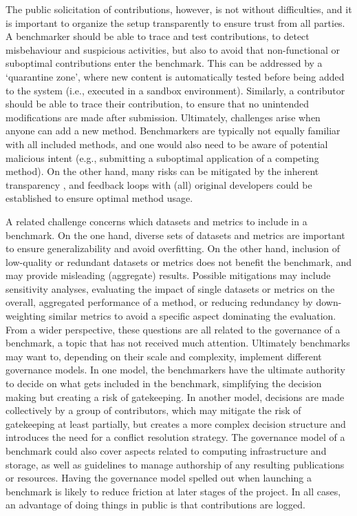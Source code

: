 \documentclass[11pt]{article}
\begin{document}
The public solicitation of contributions, however, is not without difficulties, and it is important to organize the setup transparently to ensure trust from all parties. A benchmarker should be able to trace and test contributions, to detect misbehaviour and suspicious activities, but also to avoid that non-functional or suboptimal contributions enter the benchmark. This can be addressed by a `quarantine zone', where new content is automatically tested before being added to the system (i.e., executed in a sandbox environment). Similarly, a contributor should be able to trace their contribution, to ensure that no unintended modifications are made after submission. Ultimately, challenges arise when anyone can add a new method. Benchmarkers are typically not equally familiar with all included methods, and one would also need to be aware of potential malicious intent (e.g., submitting a suboptimal application of a competing method). On the other hand, many risks can be mitigated by the inherent transparency \cite{Greenstein2016-os}, and feedback loops with (all) original developers could be established to ensure optimal method usage.

A related challenge concerns which datasets and metrics to include in a benchmark. On the one hand, diverse sets of datasets and metrics are important to ensure generalizability and avoid overfitting. On the other hand, inclusion of low-quality or redundant datasets or metrics does not benefit the benchmark, and may provide misleading (aggregate) results. Possible mitigations may include sensitivity analyses, evaluating the impact of single datasets or metrics on the overall, aggregated performance of a method, or reducing redundancy by down-weighting similar metrics to avoid a specific aspect dominating the evaluation. From a wider perspective, these questions are all related to the governance of a benchmark, a topic that has not received much attention. Ultimately benchmarks may want to, depending on their scale and complexity, implement different governance models. In one model, the benchmarkers have the ultimate authority to decide on what gets included in the benchmark, simplifying the decision making but creating a risk of gatekeeping. In another model, decisions are made collectively by a group of contributors, which may mitigate the risk of gatekeeping at least partially, but creates a more complex decision structure and introduces the need for a conflict resolution strategy. The governance model of a benchmark could also cover aspects related to computing infrastructure and storage, as well as guidelines to manage authorship of any resulting publications or resources. Having the governance model spelled out when launching a benchmark is likely to reduce friction at later stages of the project. In all cases, an advantage of doing things in public is that contributions are logged. 
\end{document}
